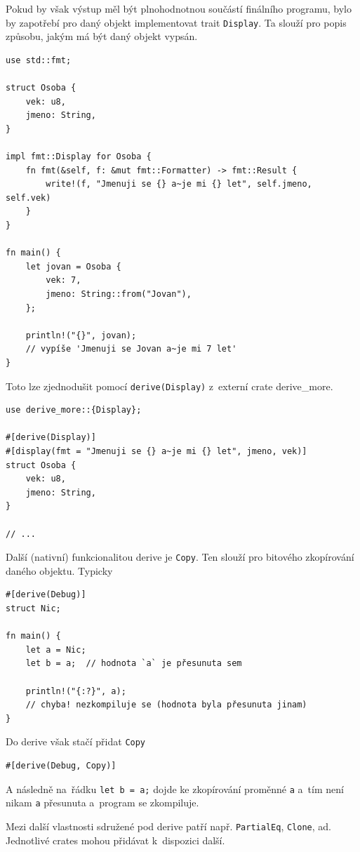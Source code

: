 \documentclass[a4paper, 12pt]{article} %
\newcommand{\rust}[1]{\texttt{#1}}
\begin{document}
            Pokud by však výstup měl být plnohodnotnou součástí finálního programu, bylo by zapotřebí pro daný objekt implementovat trait \rust{Display}. Ta slouží pro popis způsobu, jakým má být daný objekt vypsán.
            \begin{verbatim}
use std::fmt;

struct Osoba {
    vek: u8,
    jmeno: String,
}

impl fmt::Display for Osoba {
    fn fmt(&self, f: &mut fmt::Formatter) -> fmt::Result {
        write!(f, "Jmenuji se {} a~je mi {} let", self.jmeno, self.vek)
    }
}

fn main() {
    let jovan = Osoba {
        vek: 7,
        jmeno: String::from("Jovan"),
    };
    
    println!("{}", jovan);
    // vypíše 'Jmenuji se Jovan a~je mi 7 let'
}
            \end{verbatim}
            
            Toto lze zjednodušit pomocí \texttt{derive(Display)} z~externí crate derive\_more.
            \begin{verbatim}
use derive_more::{Display};

#[derive(Display)]
#[display(fmt = "Jmenuji se {} a~je mi {} let", jmeno, vek)]
struct Osoba {
    vek: u8,
    jmeno: String,
}

// ...
            \end{verbatim}

            Další (nativní) funkcionalitou derive je \rust{Copy}. Ten slouží pro bitového zkopírování daného objektu. Typicky
            \begin{verbatim}
#[derive(Debug)]
struct Nic;

fn main() {
    let a = Nic;
    let b = a;  // hodnota `a` je přesunuta sem
    
    println!("{:?}", a);
    // chyba! nezkompiluje se (hodnota byla přesunuta jinam)
}
                \end{verbatim}
            
                Do derive však stačí přidat \rust{Copy}
                \begin{verbatim}
#[derive(Debug, Copy)]
                \end{verbatim}
            
                A následně na~řádku \rust{let b = a;} dojde ke zkopírování proměnné \rust{a} a~tím není nikam \texttt{a} přesunuta a~program se zkompiluje.

                Mezi další vlastnosti sdružené pod derive patří např. \rust{PartialEq}, \rust{Clone}, ad. Jednotlivé crates mohou přidávat k~dispozici další.
\end{document}
